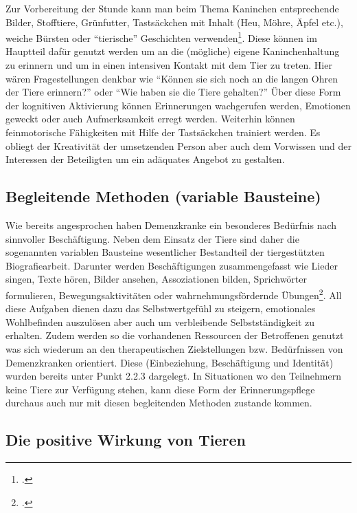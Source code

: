 Zur Vorbereitung der Stunde kann man beim Thema Kaninchen  entsprechende Bilder, Stofftiere, Grünfutter, Tastsäckchen mit Inhalt (Heu, Möhre, Äpfel etc.), weiche Bürsten oder "`tierische"' Geschichten verwenden\footcite[90-95]{Giruc2011}. Diese können im Hauptteil dafür genutzt werden um an die (mögliche) eigene Kaninchenhaltung zu erinnern und um in einen intensiven Kontakt mit dem Tier zu treten. Hier wären Fragestellungen denkbar wie "`Können sie sich noch an die langen Ohren der Tiere erinnern?"' oder "`Wie haben sie die Tiere gehalten?"' Über diese Form der kognitiven Aktivierung können Erinnerungen wachgerufen werden, Emotionen geweckt oder auch Aufmerksamkeit erregt werden. Weiterhin können feinmotorische Fähigkeiten mit Hilfe der Tastsäckchen trainiert werden. Es obliegt der Kreativität der umsetzenden Person aber auch dem Vorwissen und der Interessen der Beteiligten um ein adäquates Angebot zu gestalten.

\subsection{Begleitende Methoden (variable Bausteine)}
\label{sec:k4.4_BegleitendeMethodenVariableBausteine}

Wie bereits angesprochen haben Demenzkranke ein besonderes Bedürfnis nach sinnvoller Beschäftigung. Neben dem Einsatz der Tiere sind daher die sogenannten variablen Bausteine wesentlicher Bestandteil der tiergestützten Biografiearbeit. Darunter werden Beschäftigungen zusammengefasst wie Lieder singen, Texte hören, Bilder ansehen, Assoziationen bilden, Sprichwörter formulieren, Bewegungsaktivitäten oder wahrnehmungsfördernde Übungen\footcite[50f]{Giruc2011}. All diese Aufgaben dienen dazu das Selbstwertgefühl zu steigern, emotionales Wohlbefinden auszulösen aber auch um verbleibende Selbstständigkeit zu erhalten. Zudem werden so die vorhandenen Ressourcen der Betroffenen genutzt was sich wiederum an den therapeutischen Zielstellungen bzw. Bedürfnissen von Demenzkranken orientiert. Diese (Einbeziehung, Beschäftigung und Identität)  wurden bereits unter Punkt 2.2.3 dargelegt.
In Situationen wo den Teilnehmern keine Tiere zur Verfügung stehen, kann diese Form der Erinnerungspflege durchaus auch nur mit diesen begleitenden Methoden zustande kommen.

\subsection{Die positive Wirkung von Tieren}
\label{sec:k4.5_DiePositiveWirkungVonTieren}

